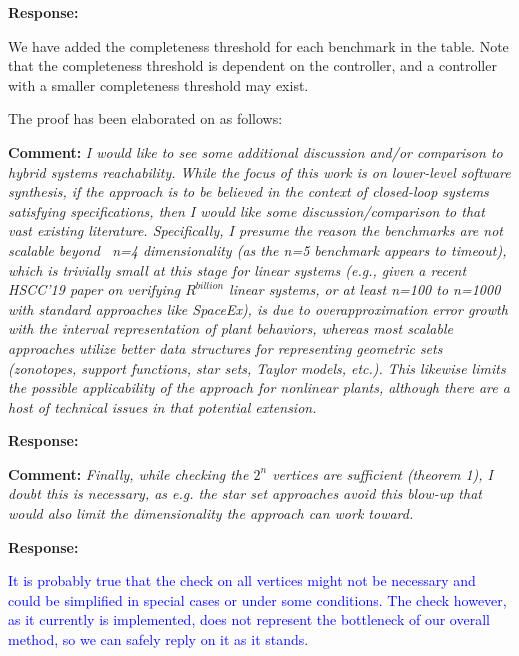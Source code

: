 \documentclass{article}
\newcommand{\rev}[1]{\textcolor{blue}{#1}}
\begin{document}
\vspace{1em}

{\bf Response: }

We have added the completeness threshold for each benchmark in the table. Note that the completeness threshold is dependent on the controller, 
and a controller with a smaller completeness threshold may exist. 

The proof has been elaborated on as follows:


\vspace{2em}

{\bf Comment: }
{\itshape I would like to see some additional discussion and/or comparison to hybrid systems reachability. While the focus of this work is on lower-level
software synthesis, if the approach is to be believed in the context of closed-loop systems satisfying specifications, then I would like some
discussion/comparison to that vast existing literature. Specifically, I presume the reason the benchmarks are not scalable beyond ~n=4 dimensionality
(as the n=5 benchmark appears to timeout), which is trivially small at this stage for linear systems (e.g., given a recent HSCC'19 paper on verifying
$R^{billion}$ linear systems, or at least n=100 to n=1000 with standard approaches like SpaceEx), is due to overapproximation error growth with the
interval representation of plant behaviors, whereas most scalable approaches utilize better data structures for representing geometric sets
(zonotopes, support functions, star sets, Taylor models, etc.). This likewise limits the possible applicability of the
approach for nonlinear plants, although there are a host of technical issues in that potential extension. }

\vspace{1em}
{\bf Response: }


\vspace{2em}
{\bf Comment: }
{\itshape Finally, while checking the $2^n$ vertices
are sufficient (theorem 1), I doubt this is necessary, as e.g. the star set approaches avoid this blow-up that would also limit the dimensionality
the approach can work toward.}
\vspace{1em}

{\bf Response: }

\rev{It is probably true that the check on all vertices might not be necessary and could be simplified in special cases or under some conditions. The check however, as it currently is implemented, does not represent the bottleneck of our overall method, so we can safely reply on it as it stands. }
\end{document}
